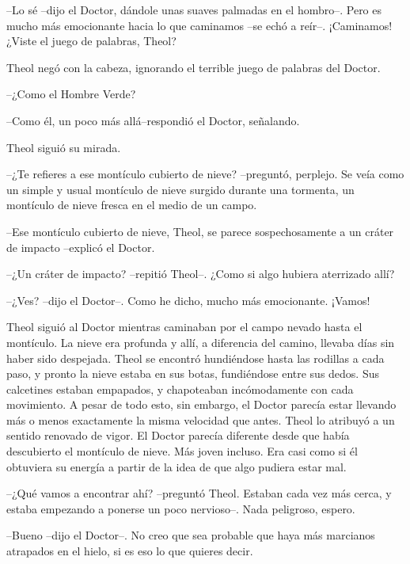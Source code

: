 --Lo sé --dijo el Doctor, dándole unas suaves palmadas en el hombro--. Pero es mucho más emocionante hacia lo que caminamos --se echó a reír--. ¡Caminamos! ¿Viste el juego de palabras, Theol?



Theol negó con la cabeza, ignorando el terrible juego de palabras del Doctor.

--¿Como el Hombre Verde?



--Como él, un poco más allá--respondió el Doctor, señalando.



Theol siguió su mirada.

--¿Te refieres a ese montículo cubierto de nieve? --preguntó, perplejo. Se veía como un simple y usual montículo de nieve surgido durante una tormenta, un montículo de nieve fresca en el medio de un campo.



--Ese montículo cubierto de nieve, Theol, se parece sospechosamente a un cráter de impacto --explicó el Doctor.



--¿Un cráter de impacto? --repitió Theol--. ¿Como si algo hubiera aterrizado allí?



--¿Ves? --dijo el Doctor--. Como he dicho, mucho más emocionante. ¡Vamos!



Theol siguió al Doctor mientras caminaban por el campo nevado hasta el montículo. La nieve era profunda y allí, a diferencia del camino, llevaba días sin haber sido despejada. Theol se encontró hundiéndose hasta las rodillas a cada paso, y pronto la nieve estaba en sus botas, fundiéndose entre sus dedos. Sus calcetines estaban empapados, y chapoteaban incómodamente con cada movimiento. A pesar de todo esto, sin embargo, el Doctor parecía estar llevando más o menos exactamente la misma velocidad que antes. Theol lo atribuyó a un sentido renovado de vigor. El Doctor parecía diferente desde que había descubierto el montículo de nieve. Más joven incluso. Era casi como si él obtuviera su energía a partir de la idea de que algo pudiera estar mal.



--¿Qué vamos a encontrar ahí? --preguntó Theol. Estaban cada vez más cerca, y estaba empezando a ponerse un poco nervioso--. Nada peligroso, espero.



--Bueno --dijo el Doctor--. No creo que sea probable que haya más marcianos atrapados en el hielo, si es eso lo que quieres decir.



